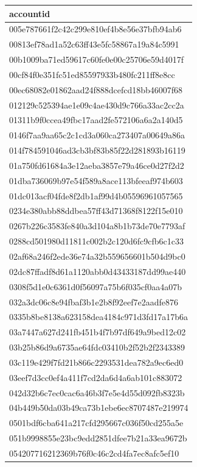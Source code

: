 \begin{tabular}{l}
\toprule
accountid \\
\midrule
005e787661f2c42c299e810ef4b8e56e37bfb94ab6 \\
00813ef78ad1a52c63ff43e5fc58867a19a84c5991 \\
00b1009ba71ed59617c60fe0e00c25706e59d4017f \\
00cf84f0e351fc51ed85597933b480fc211ff8e8cc \\
00ec68082e01862aad24f888dcefcd18bb46007f68 \\
012129c525394ae1e09c4ae430d9c766a33ac2cc2a \\
01311b9f0ccea49fbc17aad2fe572106a6a2a140d5 \\
0146f7aa9aa65c2c1cd3a060ca273407a00649a86a \\
014f784591046ad3cb3bf83b85f22d281893b16119 \\
01a750fd61684a3e12aeba3857e79a46ce0d27f2d2 \\
01dba736069b97e54f589a8ace113bfeeaf974b603 \\
01dc013acf04fde8f2db1af99d4b05596961057565 \\
0234e380abb88ddbea57ff43d71368f8122f15e010 \\
0267b226c3583fe840a3d104a8b1b73de70e7793af \\
0288cd501980d11811c002b2c120d6fc9cfb6c1c33 \\
02af68a246f2ede36e74a32b559656601b504d9bc0 \\
02dc87ffadf8d61a1120abb0d43433187dd99ae440 \\
0308f5d1e0c6361d0f56097a75b6f035cf0aa4a07b \\
032a3dc06c8e94fbaf3b1e2b8f92eef7e2aadfe876 \\
0335b8be8138a623158dea4184c971d3fd17a17b6a \\
03a7447a627d241fb451b4f7b97df649a9bed12c02 \\
03b25b86d9a6735ae64fdc03410b2f52b2f2343389 \\
03c119e429f7fd21b866c2293531dea782a9ec6ed0 \\
03eef7d3cc0ef4a411f7cd2da6d4a6ab101c883072 \\
042d32b6c7ec0cac6a46b3f7e5e4d55d092fb8323b \\
04b449b50da03b49ca73b1ebe6ec8707487e219974 \\
0501bdf6cba641a217cfd295667c036f50cd255a5e \\
051b9998855e23bc9edd2851dfee7b21a33ea9672b \\
054207716212369b76f0c46c2cd4fa7ec8afc5ef10 \\

\end{tabular}
